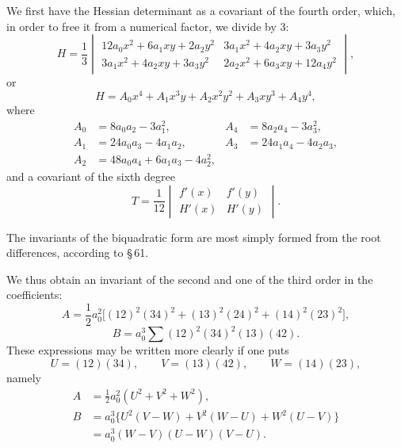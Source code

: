 \documentclass[11pt]{article}
\begin{document}
We first have the Hessian determinant as a covariant of the fourth order, which, in order to free it from a numerical factor, we divide by $3$:
\begin{equation}
 H=\frac13
 \begin{vmatrix}
 12a_0x^2+6a_1xy+2a_2y^2 & 3a_1x^2+4a_2xy+3a_3y^2\\
 3a_1x^2+4a_2xy+3a_3y^2 & 2a_2x^2+6a_3xy+12a_4y^2
 \end{vmatrix},
\tag{2}
\end{equation}
or
\[
 H=A_0x^4+A_1x^3y+A_2x^2y^2+A_3xy^3+A_4y^4,
\]
where
\[
\begin{aligned}
 A_0&=8a_0a_2-3a_1^2,& A_4&=8a_2a_4-3a_3^2,\\
 A_1&=24a_0a_3-4a_1a_2,& A_3&=24a_1a_4-4a_2a_3,\\
 A_2&=48a_0a_4+6a_1a_3-4a_2^2,
\end{aligned}
\]
and a covariant of the sixth degree
\begin{equation}
 T=\frac{1}{12}
 \begin{vmatrix}
 f'(x)&f'(y)\\
 H'(x)&H'(y)
 \end{vmatrix}.
\tag{3}
\end{equation}

The invariants of the biquadratic form are most simply formed from the root differences, according to \S\,61.

We thus obtain an invariant of the second and one of the third order in the coefficients:
\begin{equation}
 A=\frac12 a_0^2\bigl[(12)^2(34)^2+(13)^2(24)^2+(14)^2(23)^2\bigr],
\tag{4}
\end{equation}
\begin{equation}
 B=a_0^3\sum(12)^2(34)^2(13)(42).
\tag{5}
\end{equation}
These expressions may be written more clearly if one puts
\begin{equation}
 U=(12)(34),\qquad V=(13)(42),\qquad W=(14)(23),
\tag{6}
\end{equation}
namely
\begin{equation}
\begin{aligned}
 A&=\frac12 a_0^2(U^2+V^2+W^2),\\
 B&=a_0^3\{U^2(V-W)+V^2(W-U)+W^2(U-V)\}\\
  &=a_0^3(W-V)(U-W)(V-U).
\end{aligned}
\tag{7}
\end{equation}
\end{document}
